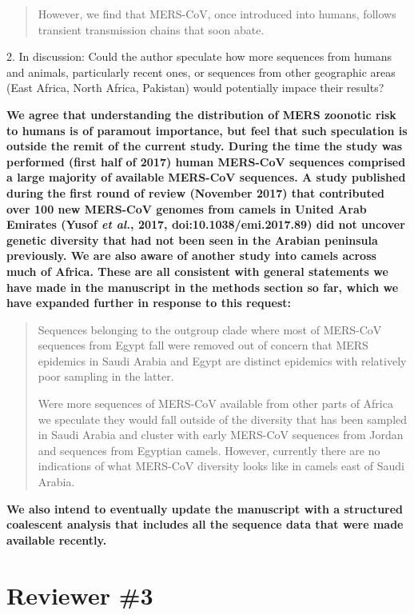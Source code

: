 \documentclass[11pt,oneside,letterpaper]{article}
\begin{document}
\begin{quotation}
However, we find that MERS-CoV, once introduced into humans, follows transient transmission chains that soon abate.
\end{quotation}

2. In discussion: Could the author speculate how more sequences from humans and animals, particularly recent ones, or sequences from other geographic areas (East Africa, North Africa, Pakistan) would potentially impace their results?

\textbf{We agree that understanding the distribution of MERS zoonotic risk to humans is of paramout importance, but feel that such speculation is outside the remit of the current study.
During the time the study was performed (first half of 2017) human MERS-CoV sequences comprised a large majority of available MERS-CoV sequences.
A study published during the first round of review (November 2017) that contributed over 100 new MERS-CoV genomes from camels in United Arab Emirates (Yusof \textit{et al.}, 2017, doi:10.1038/emi.2017.89) did not uncover genetic diversity that had not been seen in the Arabian peninsula previously.
We are also aware of another study into camels across much of Africa.
These are all consistent with general statements we have made in the manuscript in the methods section so far, which we have expanded further in response to this request:}

\begin{quotation}
Sequences belonging to the outgroup clade where most of MERS-CoV sequences from Egypt fall were removed out of concern that MERS epidemics in Saudi Arabia and Egypt are distinct epidemics with relatively poor sampling in the latter.

Were more sequences of MERS-CoV available from other parts of Africa we speculate they would fall outside of the diversity that has been sampled in Saudi Arabia and cluster with early MERS-CoV sequences from Jordan and sequences from Egyptian camels.
However, currently there are no indications of what MERS-CoV diversity looks like in camels east of Saudi Arabia.
\end{quotation}

\textbf{We also intend to eventually update the manuscript with a structured coalescent analysis that includes all the sequence data that were made available recently.}

\section*{Reviewer \#3}
\end{document}
